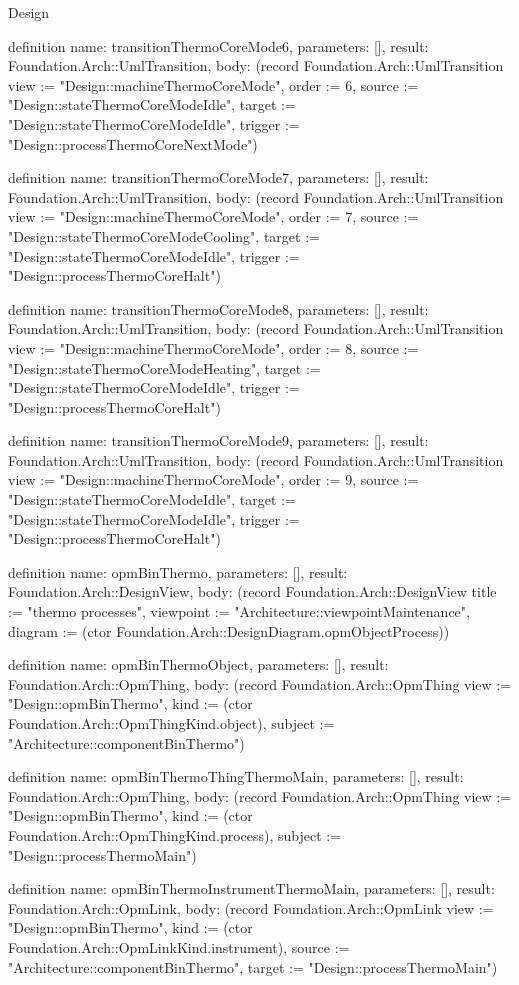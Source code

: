 \begin{lexlean}{Design}
\begin{semanticmodule}
definition{
  name: transitionThermoCoreMode6,
  parameters: [],
  result: Foundation.Arch::UmlTransition,
  body: (record Foundation.Arch::UmlTransition {view := "Design::machineThermoCoreMode", order := 6, source := "Design::stateThermoCoreModeIdle", target := "Design::stateThermoCoreModeIdle", trigger := "Design::processThermoCoreNextMode"})
}

definition{
  name: transitionThermoCoreMode7,
  parameters: [],
  result: Foundation.Arch::UmlTransition,
  body: (record Foundation.Arch::UmlTransition {view := "Design::machineThermoCoreMode", order := 7, source := "Design::stateThermoCoreModeCooling", target := "Design::stateThermoCoreModeIdle", trigger := "Design::processThermoCoreHalt"})
}

definition{
  name: transitionThermoCoreMode8,
  parameters: [],
  result: Foundation.Arch::UmlTransition,
  body: (record Foundation.Arch::UmlTransition {view := "Design::machineThermoCoreMode", order := 8, source := "Design::stateThermoCoreModeHeating", target := "Design::stateThermoCoreModeIdle", trigger := "Design::processThermoCoreHalt"})
}

definition{
  name: transitionThermoCoreMode9,
  parameters: [],
  result: Foundation.Arch::UmlTransition,
  body: (record Foundation.Arch::UmlTransition {view := "Design::machineThermoCoreMode", order := 9, source := "Design::stateThermoCoreModeIdle", target := "Design::stateThermoCoreModeIdle", trigger := "Design::processThermoCoreHalt"})
}

definition{
  name: opmBinThermo,
  parameters: [],
  result: Foundation.Arch::DesignView,
  body: (record Foundation.Arch::DesignView {title := "thermo processes", viewpoint := "Architecture::viewpointMaintenance", diagram := (ctor Foundation.Arch::DesignDiagram.opmObjectProcess)})
}

definition{
  name: opmBinThermoObject,
  parameters: [],
  result: Foundation.Arch::OpmThing,
  body: (record Foundation.Arch::OpmThing {view := "Design::opmBinThermo", kind := (ctor Foundation.Arch::OpmThingKind.object), subject := "Architecture::componentBinThermo"})
}

definition{
  name: opmBinThermoThingThermoMain,
  parameters: [],
  result: Foundation.Arch::OpmThing,
  body: (record Foundation.Arch::OpmThing {view := "Design::opmBinThermo", kind := (ctor Foundation.Arch::OpmThingKind.process), subject := "Design::processThermoMain"})
}

definition{
  name: opmBinThermoInstrumentThermoMain,
  parameters: [],
  result: Foundation.Arch::OpmLink,
  body: (record Foundation.Arch::OpmLink {view := "Design::opmBinThermo", kind := (ctor Foundation.Arch::OpmLinkKind.instrument), source := "Architecture::componentBinThermo", target := "Design::processThermoMain"})
}


\end{semanticmodule}
\end{lexlean}
